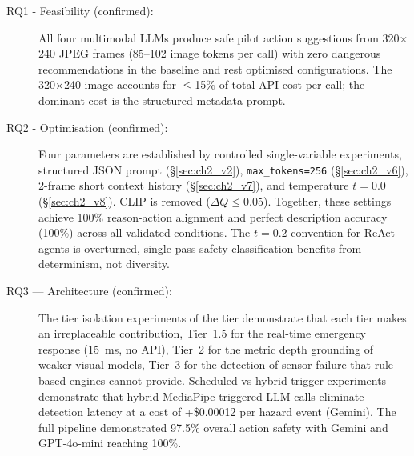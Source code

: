 \begin{description}
  \item[RQ1 - Feasibility (confirmed):]
    All four multimodal LLMs produce safe pilot action suggestions from 320$\times$240 JPEG frames (85--102 image tokens per call) with zero dangerous recommendations in the baseline and rest optimised
    configurations. 
    The 320$\times$240 image accounts for $\leq$15\% of total
    API cost per call; the dominant cost is the structured metadata prompt.
  \item[RQ2 - Optimisation (confirmed):]
    Four parameters are established by controlled single-variable experiments, structured JSON prompt (\S\ref{sec:ch2_v2}), \texttt{max\_tokens=256} (\S\ref{sec:ch2_v6}), 2-frame short context history (\S\ref{sec:ch2_v7}), and temperature $t=0.0$ (\S\ref{sec:ch2_v8}).
    CLIP is removed ($\Delta Q \leq 0.05$). Together, these settings achieve 100\% reason-action alignment and perfect description accuracy (100\%) across all validated conditions. The $t=0.2$ convention for ReAct agents is overturned, single-pass safety classification benefits from determinism, not diversity.
  \item[RQ3 --- Architecture (confirmed):]
    The tier isolation experiments of the tier demonstrate that each tier makes an irreplaceable contribution, Tier~1.5 for the real-time emergency response (15~ms, no API), Tier~2 for the metric depth grounding of weaker visual models, Tier~3 for the detection of sensor-failure that rule-based engines cannot provide. 
    Scheduled vs hybrid trigger experiments demonstrate that hybrid MediaPipe-triggered LLM calls eliminate detection latency at a cost of +\$0.00012 per hazard event (Gemini). The full pipeline demonstrated 97.5\% overall action
    safety with Gemini and GPT-4o-mini reaching 100\%.
\end{description}

